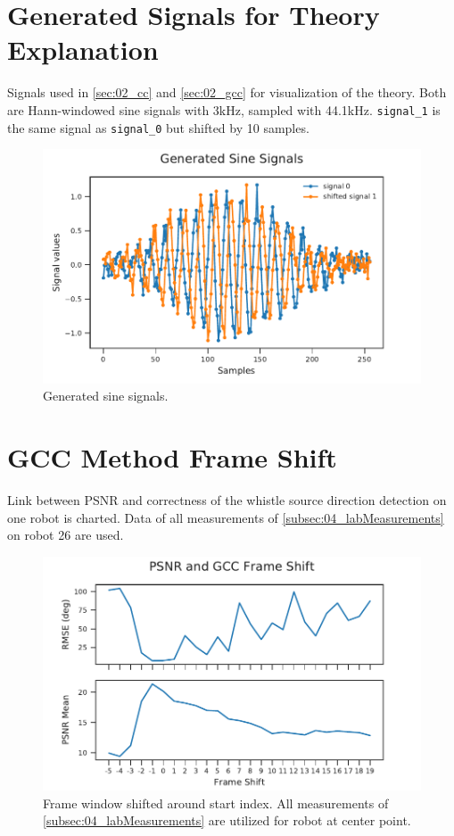 \section{Generated Signals for Theory Explanation}
\label{appendix:a1_signals}


Signals used in \cref{sec:02_cc} and \cref{sec:02_gcc} for visualization of the theory.
Both are Hann-windowed sine signals with 3\si{\kilo\hertz}, sampled with 44.1\si{\kilo\hertz}.
\lstinline!signal_1! is the same signal as \lstinline!signal_0! but shifted by
10 samples.
\begin{figure}[ht]
	\centering
		\includegraphics[width=1\columnwidth]{figures/signals_theory}
	\caption{Generated sine signals.}
	\label{fig:ap1_signals}
\end{figure}


\section{GCC Method Frame Shift}
\label{appendix:a1_gccFrameShift}

Link between \ac{PSNR} and correctness of the whistle source direction
detection on one robot is charted.
Data of all measurements of \cref{subsec:04_labMeasurements} on robot 26
are used.

\begin{figure}[ht]
	\centering
		\includegraphics[]{figures/evaluation/psnr_frame_shift_all_measurements}
	\caption{Frame window shifted around start index. All measurements of
	\cref{subsec:04_labMeasurements} are utilized for robot at center point. }
	\label{fig:ap1_gccFrameShiftAllMeasurements}
\end{figure}
